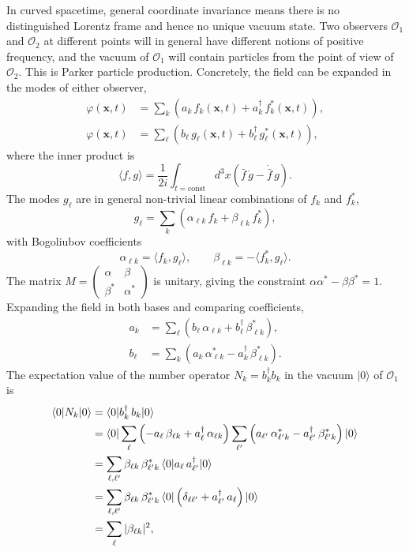In curved spacetime, general coordinate invariance means there is no
distinguished Lorentz frame and hence no unique vacuum state. Two
observers $\mathcal{O}_1$ and $\mathcal{O}_2$ at different points will
in general have different notions of positive frequency, and the vacuum
of $\mathcal{O}_1$ will contain particles from the point of view of
$\mathcal{O}_2$. This is Parker particle production. Concretely, the
field can be expanded in the modes of either observer,
\begin{align}
    \varphi(\mathbf{x},t)
    &= \sum_k\left(a_k\,f_k(\mathbf{x},t)
    + a_k^\dagger\,f_k^*(\mathbf{x},t)\right), \\
    \varphi(\mathbf{x},t)
    &= \sum_\ell\left(b_\ell\,g_\ell(\mathbf{x},t)
    + b_\ell^\dagger\,g_\ell^*(\mathbf{x},t)\right),
\end{align}
where the inner product is
\begin{equation}
    \langle f, g\rangle
    = \frac{1}{2i}\int_{t=\text{const}}d^3x
    \left(\bar f\,\dot g - \dot{\bar f}\,g\right).
\end{equation}
The modes $g_\ell$ are in general non-trivial linear combinations of
$f_k$ and $f_k^*$,
\begin{equation}
    g_\ell = \sum_k\left(\alpha_{\ell k}\,f_k
    + \beta_{\ell k}\,f_k^*\right),
\end{equation}
with Bogoliubov coefficients
\begin{equation}
    \alpha_{\ell k} = \langle f_k, g_\ell\rangle,
    \qquad
    \beta_{\ell k} = -\langle f_k^*, g_\ell\rangle.
\end{equation}
The matrix $M = \begin{pmatrix}\alpha & \beta \\ \beta^* &
\alpha^*\end{pmatrix}$ is unitary, giving the constraint
$\alpha\alpha^* - \beta\beta^* = 1$. Expanding the field in both bases
and comparing coefficients,
\begin{align}
    a_k &= \sum_\ell\left(b_\ell\,\alpha_{\ell k}
    + b_\ell^\dagger\,\beta_{\ell k}^*\right), \\
    b_\ell &= \sum_k\left(a_k\,\alpha_{\ell k}^*
    - a_k^\dagger\,\beta_{\ell k}^*\right).
\end{align}
The expectation value of the number operator $N_k = b_k^\dagger b_k$
in the vacuum $|0\rangle$ of $\mathcal{O}_1$ is
\begin{align}
    \langle 0|N_k|0\rangle
    &= \langle 0|b_k^\dagger\,b_k|0\rangle \notag\\
    &= \langle 0|\sum_\ell\left(-a_\ell\,\beta_{\ell k}
    + a_\ell^\dagger\,\alpha_{\ell k}\right)
    \sum_{\ell'}\left(a_{\ell'}\,\alpha_{\ell' k}^*
    - a_{\ell'}^\dagger\,\beta_{\ell' k}^*\right)|0\rangle \notag\\
    &= \sum_{\ell,\ell'}\beta_{\ell k}\,\beta_{\ell' k}^*\,
    \langle 0|a_\ell\,a_{\ell'}^\dagger|0\rangle \notag\\
    &= \sum_{\ell,\ell'}\beta_{\ell k}\,\beta_{\ell' k}^*\,
    \langle 0|\left(\delta_{\ell\ell'}
    + a_{\ell'}^\dagger\,a_\ell\right)|0\rangle \notag\\
    &= \sum_\ell|\beta_{\ell k}|^2,
\end{align}
